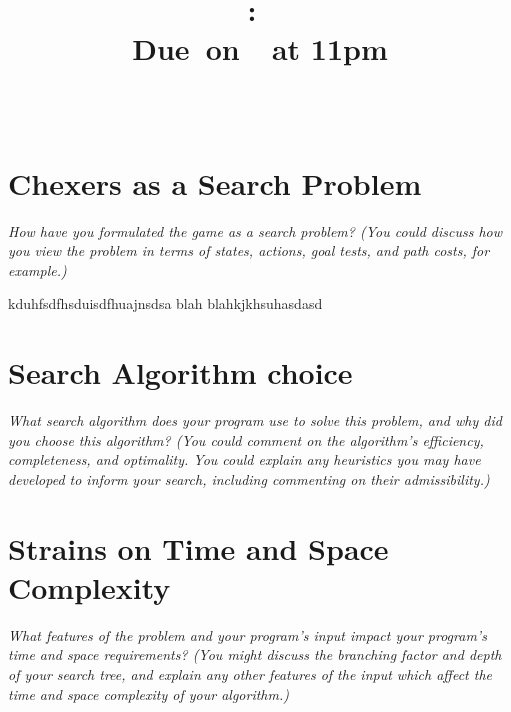 \documentclass{article}[11pt]
\title{
    \vspace{2in}
    \textmd{\textbf{\hmwkClass:\ \hmwkTitle}}\\
    \normalsize\vspace{0.1in}\small{Due\ on\ \hmwkDueDate\ at 11pm}\\
    \vspace{0.1in}\large{\textit{\hmwkClassInstructor\ \hmwkClassTime}}
    \vspace{3in}
}
\author{\hmwkAuthorName}
\date{}
\theoremstyle{plain}
\theoremstyle{definition}
\begin{document}
\maketitle

\pagebreak

\section{Chexers as a Search Problem}

\textit{How have you formulated the game as a search problem? (You could discuss how you view the problem in terms of states, actions, goal tests, and path costs, for example.)}


kduhfsdfhsduisdfhuajnsdsa
blah blahkjkhsuhasdasd

\section{Search Algorithm choice}

\textit{What search algorithm does your program use to solve this problem, and why did you choose this algorithm? (You could comment on the algorithm’s efficiency, completeness, and optimality. You could explain any heuristics you may have developed to inform your search, including commenting on their admissibility.)}



\section{Strains on Time and Space Complexity}

\textit{What features of the problem and your program’s input impact your program’s time and space requirements? (You might discuss the branching factor and depth of your search tree, and explain any other features of the input which affect the time and space complexity of your algorithm.)}
\end{document}

